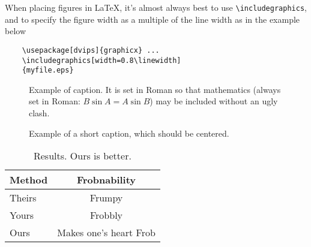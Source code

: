 


When placing figures in \LaTeX, it's almost always best to use
\verb+\includegraphics+, and to specify the  figure width as a multiple of
the line width as in the example below
{\small\begin{verbatim}
	\usepackage[dvips]{graphicx} ...
	\includegraphics[width=0.8\linewidth]
	{myfile.eps}
	\end{verbatim}
}

\begin{figure}[t]
\begin{center}
\fbox{\rule{0pt}{2in} \rule{0.9\linewidth}{0pt}}
\end{center}
   \caption{Example of caption.  It is set in Roman so that mathematics
   (always set in Roman: $B \sin A = A \sin B$) may be included without an
   ugly clash.}
\label{fig:long}
\label{fig:onecol}
\end{figure}


\begin{figure*}
	\begin{center}
		\fbox{\rule{0pt}{2in} \rule{.9\linewidth}{0pt}}
	\end{center}
	\caption{Example of a short caption, which should be centered.}
	\label{fig:short}
\end{figure*}




\begin{table}
	\begin{center}
		\begin{tabular}{|l|c|}
			\hline
			Method & Frobnability \\
			\hline\hline
			Theirs & Frumpy \\
			Yours & Frobbly \\
			Ours & Makes one's heart Frob\\
			\hline
		\end{tabular}
	\end{center}
	\caption{Results.   Ours is better.}
\end{table}

